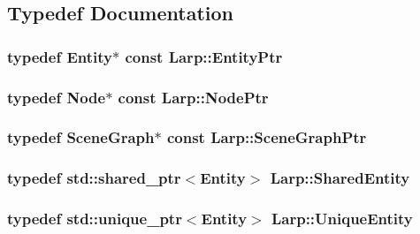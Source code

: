 \subsection{Typedef Documentation}
\hypertarget{namespaceLarp_a775efcc4cabb308d50168c52df343353}{
\subsubsection[{Entity\-Ptr}]{\setlength{\rightskip}{0pt plus 5cm}typedef {\bf Entity}$\ast$ const {\bf Larp\-::\-Entity\-Ptr}}}\label{namespaceLarp_a775efcc4cabb308d50168c52df343353}
\hypertarget{namespaceLarp_a171c1dc8b70cfb441b15d7386780db23}{
\subsubsection[{Node\-Ptr}]{\setlength{\rightskip}{0pt plus 5cm}typedef {\bf Node}$\ast$ const {\bf Larp\-::\-Node\-Ptr}}}\label{namespaceLarp_a171c1dc8b70cfb441b15d7386780db23}
\hypertarget{namespaceLarp_acf02d81e4b52238dcd17cb6249eadadc}{
\subsubsection[{Scene\-Graph\-Ptr}]{\setlength{\rightskip}{0pt plus 5cm}typedef {\bf Scene\-Graph}$\ast$ const {\bf Larp\-::\-Scene\-Graph\-Ptr}}}\label{namespaceLarp_acf02d81e4b52238dcd17cb6249eadadc}
\hypertarget{namespaceLarp_ae3ffca1f126e4263cbdc59b116ee465a}{
\subsubsection[{Shared\-Entity}]{\setlength{\rightskip}{0pt plus 5cm}typedef std\-::shared\-\_\-ptr$<${\bf Entity}$>$ {\bf Larp\-::\-Shared\-Entity}}}\label{namespaceLarp_ae3ffca1f126e4263cbdc59b116ee465a}
\hypertarget{namespaceLarp_ad6d203c6dc3d8ea7a5517a64e1665403}{
\subsubsection[{Unique\-Entity}]{\setlength{\rightskip}{0pt plus 5cm}typedef std\-::unique\-\_\-ptr$<${\bf Entity}$>$ {\bf Larp\-::\-Unique\-Entity}}}\label{namespaceLarp_ad6d203c6dc3d8ea7a5517a64e1665403}
